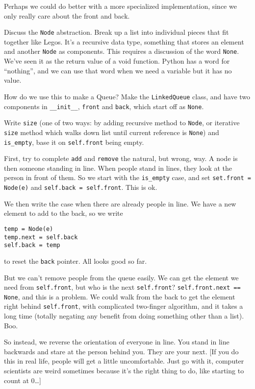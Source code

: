 \documentclass{article}
\begin{document}
Perhaps we could do better with a more specialized implementation,
since we only really care about the front and back.

Discuss the \verb|Node| abstraction. Break up a list into individual
pieces that fit together like Legos. It's a recursive data type,
something that stores an element and another \verb|Node| as
components.  This requires a discussion of the word \verb|None|. We've
seen it as the return value of a void function. Python has a word for
``nothing'', and we can use that word when we need a variable but it has
no value.

How do we use this to make a Queue? Make the \verb|LinkedQueue| class,
and have two components in \verb|__init__|, \verb|front| and
\verb|back|, which start off as \verb|None|.

Write \verb|size| (one of two ways: by adding recursive method to
\verb|Node|, or iterative \verb|size| method which walks down list
until current reference is \verb|None|) and \verb|is_empty|, base it
on \verb|self.front| being empty.

First, try to complete \verb|add| and \verb|remove| the natural, but
wrong, way. A node is then someone standing in line. When people stand
in lines, they look at the person in front of them. So we start with
the \verb|is_empty| case, and set \verb|set.front = Node(e)| and
\verb|self.back = self.front|. This is ok.

We then write the case when there are already people in line. We have a new
element to add to the back, so we write

\begin{verbatim}
temp = Node(e)
temp.next = self.back
self.back = temp
\end{verbatim}
to reset the \verb|back| pointer. All looks good so far.

But we can't remove people from the queue easily. We can get the
element we need from \verb|self.front|, but who is the next
\verb|self.front|? \verb|self.front.next == None|, and this is a problem. We
could walk from the back to get the element right behind \verb|self.front|,
with complicated two-finger algorithm, and it takes a long time
(totally negating any benefit from doing something other than a
list). Boo.

So instead, we reverse the orientation of everyone in line. You stand in
line backwards and stare at the person behind you. They are your next. [If
you do this in real life, people will get a little uncomfortable. Just go
with it, computer scientists are weird sometimes because it's the right
thing to do, like starting to count at 0\dots]
\end{document}
